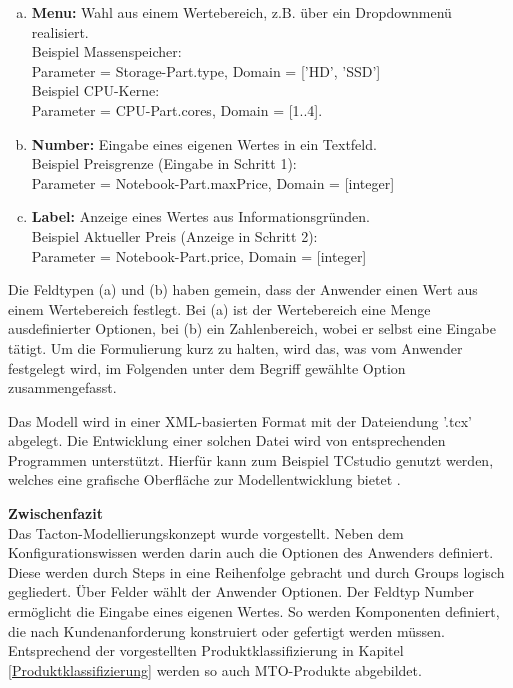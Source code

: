 \documentclass[11pt, a4paper, titlepage, listof=totoc, bibliography=totoc, index=totoc, twoside, openright, headings=normal]{scrreprt}
\begin{document}
\begin{compactitem}
\begin{enumerate}[(a)]
\item \textbf{Menu:} Wahl aus einem Wertebereich, z.B. über ein Dropdownmenü realisiert.\\
Beispiel Massenspeicher:\\
Parameter = Storage-Part.type,  Domain = ['HD', 'SSD']\\
Beispiel CPU-Kerne:\\
Parameter = CPU-Part.cores, Domain = [1..4].
\item \textbf{Number:} Eingabe eines eigenen Wertes in ein Textfeld.\\
Beispiel Preisgrenze (Eingabe in Schritt 1):\\
 Parameter = Notebook-Part.maxPrice, Domain = [integer]
\item \textbf{Label:} Anzeige eines Wertes aus Informationsgründen.\\
Beispiel Aktueller Preis (Anzeige in Schritt 2):\\
Parameter = Notebook-Part.price, Domain = [integer]
\end{enumerate}
\end{compactitem}

Die Feldtypen (a) und (b) haben gemein, dass der Anwender einen Wert aus einem Wertebereich festlegt. Bei (a) ist der Wertebereich eine Menge ausdefinierter Optionen, bei (b) ein Zahlenbereich, wobei er selbst eine Eingabe tätigt. Um die Formulierung kurz zu halten, wird das, was vom Anwender festgelegt wird, im Folgenden unter dem Begriff \glqq gewählte Option\grqq{} zusammengefasst.

Das Modell wird in einer XML-basierten Format mit der Dateiendung '.tcx' abgelegt. Die Entwicklung einer solchen Datei wird von entsprechenden Programmen unterstützt. Hierfür kann zum Beispiel \glqq TCstudio\grqq{} genutzt werden, welches eine grafische Oberfläche zur Modellentwicklung bietet \citep{tactonAbout}.

\textbf{Zwischenfazit}\\
Das Tacton-Modellierungskonzept wurde vorgestellt. Neben dem Konfigurationswissen werden darin auch die Optionen des Anwenders definiert. Diese werden durch Steps in eine Reihenfolge gebracht und durch Groups logisch gegliedert. Über Felder wählt der Anwender Optionen. Der Feldtyp Number ermöglicht die Eingabe eines eigenen Wertes. So werden Komponenten definiert, die nach Kundenanforderung konstruiert oder gefertigt werden müssen. Entsprechend der vorgestellten Produktklassifizierung in Kapitel \ref{Produktklassifizierung} werden so auch \ac{MTO}-Produkte abgebildet.
\end{document}
